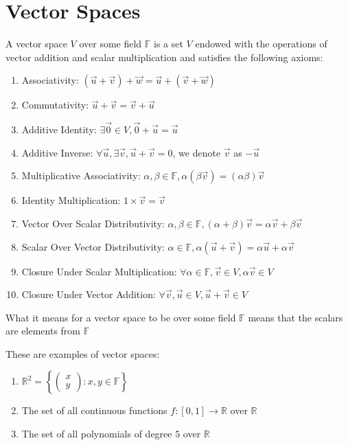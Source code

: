 \section{Vector Spaces}
\begin{definition}
    A vector space $V$ over some field $\mathbb{F}$ is a set $V$ endowed with the operations of vector addition and scalar multiplication and satisfies the following axioms:
    \begin{enumerate}
        \item Associativity: $(\vec{u}+\vec{v})+\vec{w}=\vec{u}+(\vec{v}+\vec{w})$
        \item Commutativity: $\vec{u}+\vec{v}=\vec{v}+\vec{u}$
        \item Additive Identity: $\exists\vec{0}\in V, \vec{0}+\vec{u}=\vec{u}$
        \item Additive Inverse:
        $\forall\vec{u},\exists\vec{v},\vec{u}+\vec{v}=0$, we denote $\vec{v}$ as $-\vec{u}$
        \item Multiplicative Associativity: $\alpha,\beta\in\mathbb{F}, \alpha(\beta\vec{v})=(\alpha\beta)\vec{v}$
        \item Identity Multiplication: $1\times\vec{v}=\vec{v}$
        \item Vector Over Scalar Distributivity: $\alpha,\beta\in\mathbb{F},(\alpha+\beta)\vec{v}=\alpha\vec{v}+\beta\vec{v}$
        \item Scalar Over Vector Distributivity:
        $\alpha\in\mathbb{F},\alpha(\vec{u}+\vec{v})=\alpha\vec{u}+\alpha\vec{v}$
        \item Closure Under Scalar Multiplication:
        $\forall\alpha\in\mathbb{F},\vec{v}\in V, \alpha\vec{v}\in V$
        \item Closure Under Vector Addition: $\forall\vec{v},\vec{u}\in V, \vec{u}+\vec{v}\in V$
    \end{enumerate}
\end{definition}
\begin{remark}
    What it means for a vector space to be over some field $\mathbb{F}$ means that the scalars are elements from $\mathbb{F}$
\end{remark}
\begin{example}
    These are examples of vector spaces:
    \begin{enumerate}
        \item $\mathbb{R}^2=\left\{\begin{pmatrix}
            x \\ y
        \end{pmatrix}: x,y\in\mathbb{F}\right\}$
        \item The set of all continuous functions $f:[0,1]\to\mathbb{R}$ over $\mathbb{R}$
        \item The set of all polynomials of degree $5$ over $\mathbb{R}$
    \end{enumerate}
\end{example}
